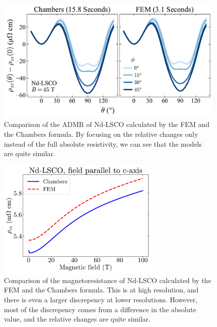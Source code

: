 \documentclass[12pt]{article}
\begin{document}
\begin{figure}%
    \centering
    \includegraphics[width=\textwidth]{figures/fem_vs_chambers_admr}
    \caption{Comparison of the ADMR of Nd-LSCO calculated by the FEM and the Chambers formula.
        By focusing on the relative changes only instead of the full absolute resistivity, we
        can see that the models are quite similar.}
    \label{fig:fem_vs_chambers_admr}
\end{figure}
\begin{figure}%
    \centering
    \includegraphics[width=0.7\textwidth]{figures/fem_vs_chambers_resistivity}
    \caption{Comparison of the magnetoresistance of Nd-LSCO calculated by the FEM and the
        Chambers formula. This is at high resolution, and there is even a larger discrepency
        at lower resolutions. However, most of the discrepency comes from a difference in the
        absolute value, and the relative changes are quite similar.}
    \label{fig:fem_vs_chambers_resistivity}
\end{figure}
\end{document}
